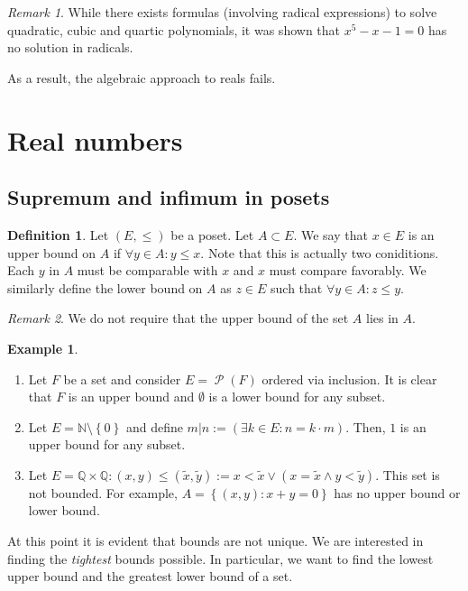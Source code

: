 \documentclass{article}
\newcommand\N{\ensuremath{\mathbb{N}}}
\renewcommand\O{\ensuremath{\emptyset}}
\newcommand\Q{\ensuremath{\mathbb{Q}}}
\DeclareMathOperator{\ps}{\mathcal{P}}
\theoremstyle{definition}
\newtheorem{definition}{Definition}[subsection]
\newtheorem{eg}{Example}[subsection]
\theoremstyle{remark}
\newtheorem*{remark}{Remark}
\theoremstyle{plain}
\begin{document}
\begin{remark}
    While there exists formulas (involving radical expressions) to solve quadratic, cubic and quartic polynomials, it was shown that \(x^5 -x -1 = 0\) has no solution in radicals.
\end{remark}

As a result, the algebraic approach to reals fails. 

\section{Real numbers}
\subsection{Supremum and infimum in posets}

\begin{definition}
    Let \((E, \leq)\) be a poset. Let \(A\subset E\). We say that \(x\in E\) is an upper bound
    on \(A\) if \(\forall y \in A: y\leq x\). Note that this is actually two coniditions. Each \(y\) in \(A\)
    must be comparable with \(x\) and \(x\) must compare favorably. We similarly define the lower bound on \(A\) as
    \(z \in E\) such that \(\forall y \in A: z \leq y\).
\end{definition}
\begin{remark}
    We do not require that the upper bound of the set \(A\) lies in \(A\).
\end{remark}

\begin{eg}
    \begin{enumerate}
        \item Let \(F\) be a set and consider \(E = \ps(F)\) ordered via inclusion. It is clear that
        \(F\) is an upper bound and \(\O\) is a lower bound for any subset.
        \item Let \(E = \N\setminus\left\{ 0 \right\}\) and define \(m|n := (\exists k \in E: n = k\cdot m)\). 
        Then, \(1\) is an upper bound for any subset.
        \item Let \(E = \Q \times \Q: (x,y) \leq (\tilde{x}, \tilde{y}):= x < \tilde{x} \lor (x = \tilde{x} \land y < \tilde{y})\). 
        This set is not bounded. For example, \(A = \left\{ (x,y): x+y = 0 \right\}\) has no upper bound or lower bound.
    \end{enumerate}
\end{eg}

At this point it is evident that bounds are not unique. We are interested in finding the \emph{tightest} bounds possible.
In particular, we want to find the lowest upper bound and the greatest lower bound of a set.
\end{document}
